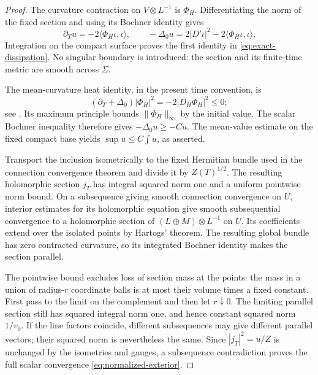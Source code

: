\begin{proof}
The curvature contraction on $V\otimes L^{-1}$ is $\Phi_H$.
Differentiating the norm of the fixed section and using its
Bochner identity \cite[Proposition~3.1.8]{Kobayashi87} gives
\[
 \partial_Tu=-2\langle\Phi_H\iota,\iota\rangle,\qquad
 -\Delta_0u=2|D'\iota|^2
                         -2\langle\Phi_H\iota,\iota\rangle .
\]
Integration on the compact surface proves the first identity in
\eqref{eq:exact-dissipation}. No singular boundary is introduced:
the section and its finite-time metric are smooth across $\Sigma$.

The mean-curvature heat identity, in the present time convention, is
\begin{equation}\label{eq:mean-curvature-heat}
 (\partial_T+\Delta_0)|\Phi_H|^2=-2|D_H\Phi_H|^2\le0;
\end{equation}
see \cite[Proposition~6.9.1 and equation~(6.9.2)]{Kobayashi87}.
Its maximum principle bounds $\|\Phi_H\|_\infty$ by the initial
value. The scalar Bochner inequality therefore gives
$-\Delta_0u\ge-Cu$. The mean-value estimate on the fixed compact
base yields $\sup u\le C\int u$, as asserted.

Transport the inclusion isometrically to the fixed Hermitian
bundle used in the connection convergence theorem and divide it
by $Z(T)^{1/2}$. The resulting holomorphic section $j_T$ has
integral squared norm one and a uniform pointwise norm bound.
On a subsequence giving smooth connection convergence on $U$,
interior estimates for its holomorphic equation give smooth
subsequential convergence to a holomorphic section of
$(L\oplus M)\otimes L^{-1}$ on $U$. Its coefficients extend
over the isolated points by Hartogs' theorem. The resulting
global bundle has zero contracted curvature, so its integrated
Bochner identity makes the section parallel.

The pointwise bound excludes loss of section mass at the points:
the mass in a union of radius-$r$ coordinate balls is at most
their volume times a fixed constant. First pass to the limit on
the complement and then let $r\downarrow0$. The limiting parallel
section still has squared integral norm one, and hence constant
squared norm $1/v_0$. If the line factors coincide, different
subsequences may give different parallel vectors; their squared
norm is nevertheless the same. Since $|j_T|^2=u/Z$ is unchanged
by the isometries and gauges, a subsequence contradiction proves
the full scalar convergence \eqref{eq:normalized-exterior}.
\end{proof}

